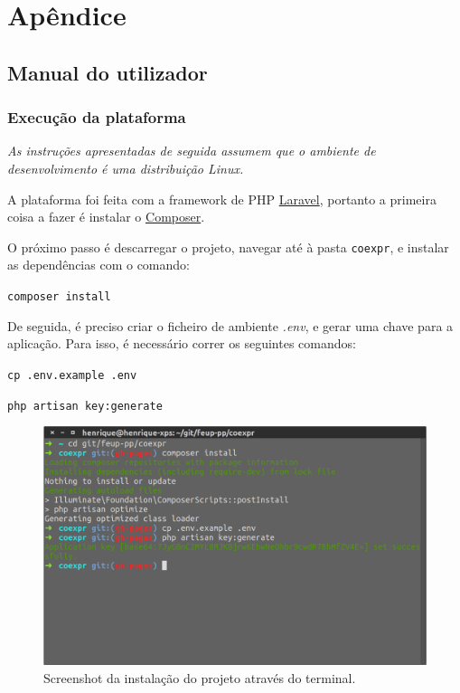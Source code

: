 \appendix

\section{Apêndice}


\subsection{Manual do utilizador}


\subsubsection{Execução da plataforma}

\textit{As instruções apresentadas de seguida assumem que o ambiente de desenvolvimento é uma distribuição Linux.}

\bigskip

A plataforma foi feita com a framework de PHP \href{https://laravel.com/}{Laravel}, portanto a primeira coisa a fazer é instalar o \href{https://getcomposer.org/}{Composer}.

\bigskip

O próximo passo é descarregar o projeto, navegar até à pasta \texttt{coexpr}, e instalar as dependências com o comando:

\smallskip

\texttt{composer install}

\bigskip

De seguida, é preciso criar o ficheiro de ambiente \textit{.env}, e gerar uma chave para a aplicação. Para isso, é necessário correr os seguintes comandos:

\smallskip

\texttt{cp .env.example .env}

\texttt{php artisan key:generate}

\medskip

\begin{figure}[ht]
    \centering
    \includegraphics[width=1\linewidth]{res/install-proj.png}
    \caption{Screenshot da instalação do projeto através do terminal.}
\end{figure}

